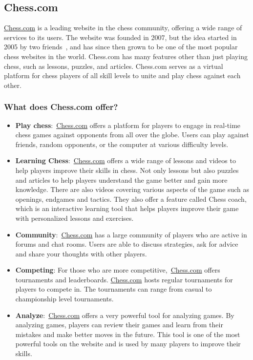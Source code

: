 \subsection{Chess.com}\label{subsec:chess-com}

\url{Chess.com} is a leading website in the chess community, offering a wide range of services to its users.
The website was founded in 2007, but the idea started in 2005 by two friends~\cite{Chess.com}, and has since then grown
to be one of the most popular chess websites in the world.
Chess.com has many features other than just playing chess, such as lessons, puzzles, and articles.
Chess.com serves as a virtual platform for chess players of all skill levels to unite and play chess against each other.


\subsubsection{What does Chess.com offer?}\label{subsubsec:what-does-chess-com-offer}

\begin{itemize}
    \item \textbf{Play chess}:~\url{Chess.com} offers a platform for players to engage in real-time chess games against
    opponents from all over the globe.
    Users can play against friends, random opponents, or the computer at various difficulty levels.
    \item \textbf{Learning Chess}:~\url{Chess.com} offers a wide range of lessons and videos to help players
    improve their skills in chess.
    Not only lessons but also puzzles and articles to help players understand the game better and gain more knowledge.
    There are also videos covering various aspects of the game such as openings, endgames and tactics.
    They also offer a feature called Chess coach, which is an interactive learning tool that helps players improve
    their game with personalized lessons and exercises.
    \item \textbf{Community}:~\url{Chess.com} has a large community of players who are active in forums and chat rooms.
    Users are able to discuss strategies, ask for advice and share your thoughts with other players.
    \item \textbf{Competing}: For those who are more competitive,~\url{Chess.com} offers tournaments and leaderboards.
    \url{Chess.com} hosts regular tournaments for players to compete in.
    The tournaments can range from casual to championship level tournaments.
    \item \textbf{Analyze}:~\url{Chess.com} offers a very powerful tool for analyzing games.
    By analyzing games, players can review their games and learn from their mistakes and make
    better moves in the future.
    This tool is one of the most powerful tools on the website and is used by many players to improve their skills.
\end{itemize}
